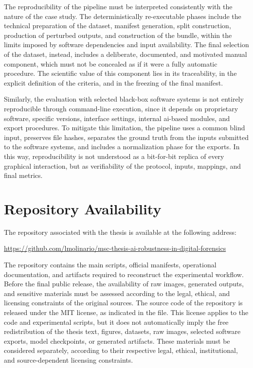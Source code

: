 The reproducibility of the pipeline must be interpreted consistently with the
nature of the case study. The deterministically re-executable phases include the
technical preparation of the dataset, manifest generation, split construction,
production of perturbed outputs, and construction of the bundle, within the
limits imposed by software dependencies and input availability. The final
selection of the dataset, instead, includes a deliberate, documented, and
motivated manual component, which must not be concealed as if it were a fully
automatic procedure. The scientific value of this component lies in its
traceability, in the explicit definition of the criteria, and in the freezing of
the final manifest.

Similarly, the evaluation with selected black-box software systems is not
entirely reproducible through command-line execution, since it depends on
proprietary software, specific versions, interface settings, internal
\gls{ai}-based modules, and export procedures. To mitigate this limitation, the
pipeline uses a common blind input, preserves file hashes, separates the ground
truth from the inputs submitted to the software systems, and includes a
normalization phase for the exports. In this way, reproducibility is not
understood as a bit-for-bit replica of every graphical interaction, but as
verifiability of the protocol, inputs, mappings, and final metrics.


\section{Repository Availability}
\label{app:repository-availability}

The repository associated with the thesis is available at the following address:

\begin{center}
\url{https://github.com/lmolinario/msc-thesis-ai-robustness-in-digital-forensics}
\end{center}

The repository contains the main scripts, official manifests, operational
documentation, and artifacts required to reconstruct the experimental workflow.
Before the final public release, the availability of raw images, generated
outputs, and sensitive materials must be assessed according to the legal,
ethical, and licensing constraints of the original sources. The source code of
the repository is released under the MIT license, as indicated in the
 file. This license applies to the code and experimental
scripts, but it does not automatically imply the free redistribution of the
thesis text, figures, datasets, raw images, selected software exports, model
checkpoints, or generated artifacts. These materials must be considered
separately, according to their respective legal, ethical, institutional, and
source-dependent licensing constraints.
